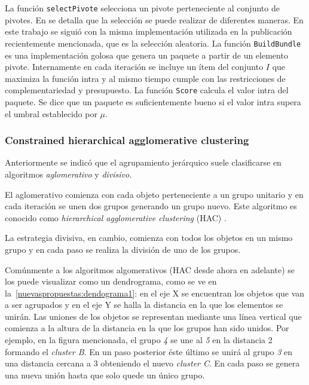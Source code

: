 La función \texttt{selectPivote} selecciona un pivote perteneciente al conjunto de pivotes. En \cite{journals/tkde/Amer-YahiaBCFMZ14,Manning:2008:IIR:1394399} se detalla que la selección se puede realizar de diferentes maneras. En este trabajo se siguió con la misma implementación utilizada en la publicación recientemente mencionada, que es la selección aleatoria. La función \texttt{BuildBundle} es una implementación golosa que genera un paquete a partir de un elemento pivote. Internamente en cada iteración se incluye un ítem del conjunto $I$ que maximiza la función intra y al mismo tiempo cumple con las restricciones de complementariedad y presupuesto. La función \texttt{Score} calcula el valor intra del paquete. Se dice que un paquete es suficientemente bueno si el valor intra supera el umbral establecido por $\mu$.

\subsubsection{Constrained hierarchical agglomerative clustering}
Anteriormente se indicó que el agrupamiento jerárquico suele clasificarse en algoritmos \textit{aglomerativo} y \textit{divisivo}. 

El aglomerativo comienza con cada objeto perteneciente a un grupo unitario y en cada iteración se unen dos grupos generando un grupo nuevo. Este algoritmo es conocido como \textit{hierarchical agglomerative clustering} (HAC) \cite{journals/tkde/Amer-YahiaBCFMZ14,Manning:2008:IIR:1394399}. 

La estrategia divisiva, en cambio, comienza con todos los objetos en un mismo grupo y en cada paso se realiza la división de uno de los grupos.

Comúnmente a los algoritmos algomerativos (HAC desde ahora en adelante) se los puede visualizar como un dendrograma, como se ve en la~\autoref{nuevaspropuestas:dendograma1}: en el eje X se encuentran los objetos que van a ser agrupados y en el eje Y se halla la distancia en la que los elementos se unirán. Las uniones de los objetos se representan mediante una línea vertical que comienza a la altura de la distancia en la que los grupos han sido unidos. Por ejemplo, en la figura mencionada, el grupo \textit{4} se une al \textit{5} en la distancia 2 formando el \textit{cluster B}. En un paso posterior éste último se unirá al grupo \textit{3} en una distancia cercana a 3 obteniendo el nuevo \textit{cluster C}. En cada paso se genera una nueva unión hasta que solo quede un único grupo.

